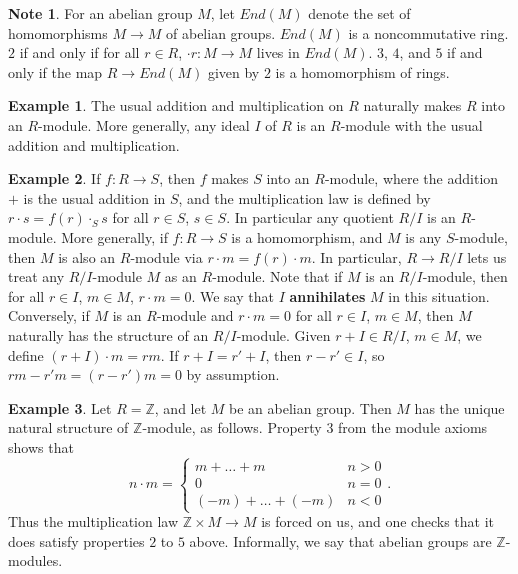 \documentclass{article}
\newcommand{\Z}{\mathbb{Z}}
\newcommand{\rb}[1]{\left( #1 \right)}
\theoremstyle{definition}\newtheorem{definition}{Definition}[subsection]
\theoremstyle{definition}\newtheorem{remark}[definition]{Remark}
\theoremstyle{definition}\newtheorem*{example}{Example}
\theoremstyle{definition}\newtheorem*{note}{Note}
\begin{document}
\begin{note}
For an abelian group $ M $, let $ End\rb{M} $ denote the set of homomorphisms $ M \to M $ of abelian groups. $ End\rb{M} $ is a noncommutative ring. $ 2 $ if and only if for all $ r \in R $, $ \cdot r : M \to M $ lives in $ End\rb{M} $. $ 3 $, $ 4 $, and $ 5 $ if and only if the map $ R \to End\rb{M} $ given by $ 2 $ is a homomorphism of rings.
\end{note}

\begin{example}
The usual addition and multiplication on $ R $ naturally makes $ R $ into an $ R $-module. More generally, any ideal $ I $ of $ R $ is an $ R $-module with the usual addition and multiplication.
\end{example}

\begin{example}
If $ f : R \to S $, then $ f $ makes $ S $ into an $ R $-module, where the addition $ + $ is the usual addition in $ S $, and the multiplication law is defined by $ r \cdot s = f\rb{r} \cdot_S s $ for all $ r \in S $, $ s \in S $. In particular any quotient $ R / I $ is an $ R $-module. More generally, if $ f : R \to S $ is a homomorphism, and $ M $ is any $ S $-module, then $ M $ is also an $ R $-module via $ r \cdot m = f\rb{r} \cdot m $. In particular, $ R \to R / I $ lets us treat any $ R / I $-module $ M $ as an $ R $-module. Note that if $ M $ is an $ R / I $-module, then for all $ r \in I $, $ m \in M $, $ r \cdot m = 0 $. We say that $ I $ \textbf{annihilates} $ M $ in this situation. Conversely, if $ M $ is an $ R $-module and $ r \cdot m = 0 $ for all $ r \in I $, $ m \in M $, then $ M $ naturally has the structure of an $ R / I $-module. Given $ r + I \in R / I $, $ m \in M $, we define $ \rb{r + I} \cdot m = rm $. If $ r + I = r' + I $, then $ r - r' \in I $, so $ rm - r'm = \rb{r - r'}m = 0 $ by assumption.
\end{example}

\begin{example}
Let $ R = \Z $, and let $ M $ be an abelian group. Then $ M $ has the unique natural structure of $ \Z $-module, as follows. Property $ 3 $ from the module axioms shows that
$$ n \cdot m = \begin{cases} m + \dots + m & n > 0 \\ 0 & n = 0 \\ \rb{-m} + \dots + \rb{-m} & n < 0 \end{cases}. $$
Thus the multiplication law $ \Z \times M \to M $ is forced on us, and one checks that it does satisfy properties $ 2 $ to $ 5 $ above. Informally, we say that abelian groups are $ \Z $-modules.
\end{example}
\end{document}
